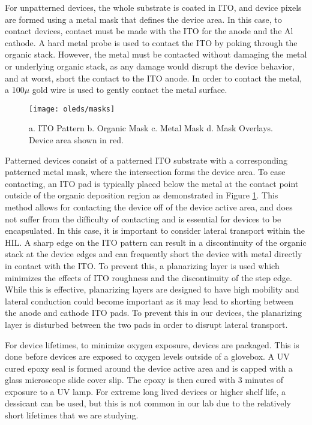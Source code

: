 \documentclass[../thesis.tex]{subfiles}
\begin{document}
For unpatterned devices, the whole substrate is coated in ITO, and device pixels are formed using a metal mask that defines the device area.
In this case, to contact devices, contact must be made with the ITO for the anode and the Al cathode.
A hard metal probe is used to contact the ITO by poking through the organic stack.
However, the metal must be contacted without damaging the metal or underlying organic stack, as any damage would disrupt the device behavior, and at worst, short the contact to the ITO anode.
In order to contact the metal, a 100$\mu$ gold wire is used to gently contact the metal surface.

\begin{figure}[ht]
    \centering
    \texttt{[image: oleds/masks]}
    \caption{a. ITO Pattern b. Organic Mask c. Metal Mask d. Mask Overlays.  Device area shown in red.}
    \label{fig:oleds_masking}\par\vfill
\end{figure}

Patterned devices consist of a patterned ITO substrate with a corresponding patterned metal mask, where the intersection forms the device area.
To ease contacting, an ITO pad is typically placed below the metal at the contact point outside of the organic deposition region as demonstrated in Figure \ref{fig:oleds_masking}.
This method allows for contacting the device off of the device active area, and does not suffer from the difficulty of contacting and is essential for devices to be encapsulated.
In this case, it is important to consider lateral transport within the HIL.
A sharp edge on the ITO pattern can result in a discontinuity of the organic stack at the device edges and can frequently short the device with metal directly in contact with the ITO.
To prevent this, a planarizing layer is used which minimizes the effects of ITO roughness and the discontinuity of the step edge.
While this is effective, planarizing layers are designed to have high mobility and lateral conduction could become important as it may lead to shorting between the anode and cathode ITO pads.
To prevent this in our devices, the planarizing layer is disturbed between the two pads in order to disrupt lateral transport.

For device lifetimes, to minimize oxygen exposure, devices are packaged.
This is done before devices are exposed to oxygen levels outside of a glovebox.
A UV cured epoxy seal is formed around the device active area and is capped with a glass microscope slide cover slip.
The epoxy is then cured with 3 minutes of exposure to a UV lamp.
For extreme long lived devices or higher shelf life, a dessicant can be used, but this is not common in our lab due to the relatively short lifetimes that we are studying.
\end{document}
